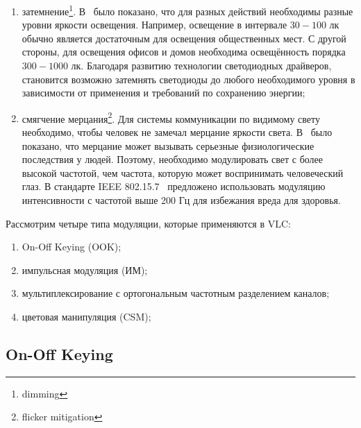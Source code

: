 \begin{enumerate}
    \item затемнение\footnote{dimming}. В~\cite{Zukauskas2002} было показано, что для разных действий необходимы разные уровни яркости освещения. Например, освещение в интервале $30-100$ лк обычно является достаточным для освещения общественных мест. С другой стороны, для освещения офисов и домов необходима освещённость порядка $300-1000$ лк. Благодаря развитию технологии светодиодных драйверов, становится возможно затемнять светодиоды до любого необходимого уровня в зависимости от применения и требований по сохранению энергии;
    \item смягчение мерцания\footnote{flicker mitigation}. Для системы коммуникации по видимому свету необходимо, чтобы человек не замечал мерцание яркости света. В~\cite{Berman1991} было показано, что мерцание может вызывать серьезные физиологические последствия у людей. Поэтому, необходимо модулировать свет с более высокой частотой, чем частота, которую может воспринимать человеческий глаз. В стандарте IEEE 802.15.7~\cite{IEEE2018} предложено использовать модуляцию интенсивности с частотой выше 200 Гц для избежания вреда для здоровья. 
\end{enumerate}

Рассмотрим четыре типа модуляции, которые применяются в VLC: 


\begin{enumerate}
    \item On-Off Keying (OOK);
    \item импульсная модуляция (ИМ);
    \item мультиплексирование с ортогональным частотным разделением каналов;
    \item цветовая манипуляция (CSM);
\end{enumerate}

\subsection{On-Off Keying}


